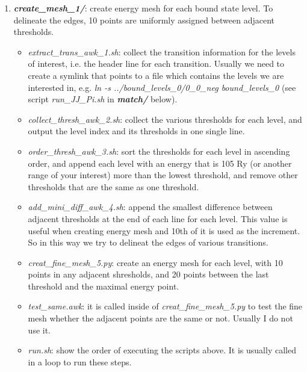 \begin{enumerate}
	\item \textbf{\textit{create\_mesh\_1/}}: create energy mesh for each bound state level. To delineate the edges, 10 points are uniformly assigned between adjacent thresholds.
		\begin{itemize}
			\item \textit{extract\_trans\_awk\_1.sh}: collect the transition information for the levels of interest, i.e. the header line for each transition. Usually we need to create a symlink that points to a file which contains the levels we are interested in, e.g. \colorbox{gray!20} {\textit{ln -s ../bound\_levels\_0/0\_0\_neg bound\_levels\_0}} (see script \textit{run\_JJ\_Pi.sh} in \textbf{\textit{match/}} below).
			\item \textit{collect\_thresh\_awk\_2.sh}:  collect the various thresholds for each level, and output the level index and its thresholds in one single line.
			\item \textit{order\_thresh\_awk\_3.sh}: sort the thresholds for each level in ascending order, and append each level with an energy that is 105 Ry (or another range of your interest) more than the lowest threshold, and remove other thresholds that are the same as one threshold.
			\item \textit{add\_mini\_diff\_awk\_4.sh}: append the smallest difference between adjacent thresholds at the end of each line for each level. This value is useful when creating energy mesh and 10th of it is used as the increment. So in this way we try to delineat the edges of various transitions.
			\item \textit{creat\_fine\_mesh\_5.py}: create an energy mesh for each level, with 10 points in any adjacent shresholds, and 20 points between the last threshold and the maximal energy point.
			\item \textit{test\_same.awk}:  it is called inside of \textit{creat\_fine\_mesh\_5.py} to test the fine mesh whether the adjacent points are the same or not. Usually I do not use it.
			\item \textit{run.sh}: show the order of executing the scripts above. It is usually called in a loop to run these steps.
		\end{itemize}
	

\end{enumerate}
